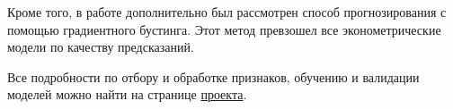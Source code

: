 \documentclass[]{article}
\begin{document}
 Кроме того, в работе дополнительно был рассмотрен способ прогнозирования с помощью градиентного бустинга. Этот метод превзошел все эконометрические модели по качеству предсказаний. 
 
 Все подробности по отбору и обработке признаков, обучению и валидации моделей можно найти на странице 	\href{https://github.com/MaximKiryakin/Vega/tree/main/%D0%A4%D0%B8%D0%BD%D0%B0%D0%BD%D1%81%D0%BE%D0%B2%D0%B0%D1%8F%20%D1%8D%D0%BA%D0%BE%D0%BD%D0%BE%D0%BC%D0%B5%D1%82%D1%80%D0%B8%D0%BA%D0%B0/%D0%9F%D1%80%D0%BE%D0%B5%D0%BA%D1%82%201}{проекта}. 
	
\end{document}
